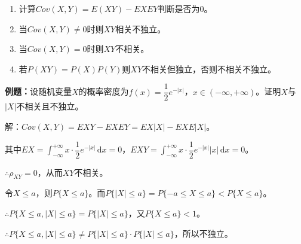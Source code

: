 \begin{enumerate}
    \item 计算$Cov(X,Y)=E(XY)-EXEY$判断是否为0。
    \item 当$Cov(X,Y)\neq0$时则$XY$相关不独立。
    \item 当$Cov(X,Y)=0$时则$XY$不相关。
    \item 若$P(XY)=P(X)P(Y)$则$XY$不相关但独立，否则不相关不独立。
\end{enumerate}

\textbf{例题：}设随机变量$X$的概率密度为$f(x)=\dfrac{1}{2}e^{-\vert x\vert}$，$x\in(-\infty,+\infty)$。证明$X$与$\vert X\vert$不相关且不独立。

解：$Cov(X,Y)=EXY-EXEY=EX\vert X\vert-EXE\vert X\vert$。

其中$EX=\displaystyle{\int_{-\infty}^{+\infty}}x\cdot\dfrac{1}{2}e^{-\vert x\vert}\,\textrm{d}x=0$，$EXY=\displaystyle{\int_{-\infty}^{+\infty}}x\cdot\dfrac{1}{2}e^{-\vert x\vert}\vert x\vert\,\textrm{d}x=0$。

$\therefore\rho_{XY}=0$，从而$XY$不相关。

令$X\leqslant a$，则$P\{X\leqslant a\}$。而$P\{\vert X\vert\leqslant a\}=P\{-a\leqslant X\leqslant a\}<P\{X\leqslant a\}$。

$\therefore P\{X\leqslant a,\vert X\vert\leqslant a\}=P\{\vert X\vert\leqslant a\}$，又$P\{X\leqslant a\}<1$。

$\therefore P\{X\leqslant a,\vert X\vert\leqslant a\}\neq P\{\vert X\vert\leqslant a\}\cdot P\{\vert X\vert\leqslant a\}$，所以不独立。

%

